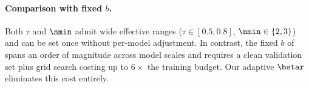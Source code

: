 \paragraph{Comparison with fixed $b$.}
Both $\tau$ and $\nmin$ admit wide effective ranges ($\tau \in [0.5, 0.8]$, $\nmin \in \{2, 3\}$) and can be set once without per-model adjustment.
In contrast, the fixed $b$ of \citet{drayson_2025_detection_collapse} spans an order of magnitude across model scales and requires a clean validation set plus grid search costing up to $6{\times}$ the training budget.
Our adaptive $\bstar$ eliminates this cost entirely.
